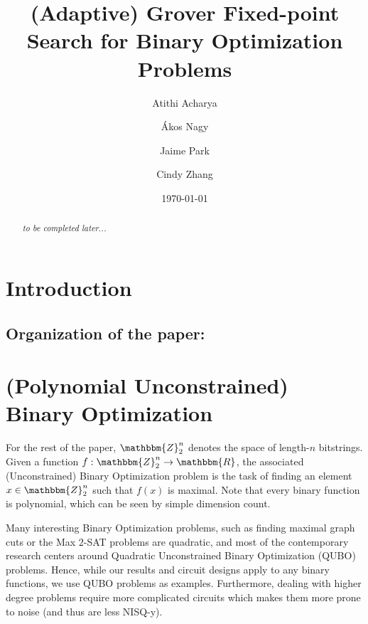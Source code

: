 \documentclass[reqno,oneside,12pt]{amsart}  %
\title{(Adaptive) Grover Fixed-point Search for Binary Optimization Problems}
\date{\today}
\author{Atithi Acharya}
\author{\'Akos Nagy}
\author{Jaime Park}
\author{Cindy Zhang}
\numberwithin{equation}{section}                %
\newtheorem*{acknowledgment}{Acknowledgments}
\def\rl{\mathbbm{R}}
\def\Z{\mathbbm{Z}}
\begin{document}
\begin{abstract}
	\textit{to be completed later...}
\end{abstract}

\maketitle

\section{Introduction}


\smallskip

\subsection*{Organization of the paper:} 

\begin{comment}
\smallskip

\begin{acknowledgment}
   
\end{acknowledgment}
\end{comment}

\bigskip

\section{(Polynomial Unconstrained) Binary Optimization}
\label{sec:qubos}

For the rest of the paper, $\Z_2^n$ denotes the space of length-$n$ bitstrings. Given a function $f : \Z_2^n \rightarrow \rl$, the associated (Unconstrained) Binary Optimization problem is the task of finding an element $x \in \Z_2^n$ such that $f (x)$ is maximal. Note that every binary function is polynomial, which can be seen by simple dimension count.

Many interesting Binary Optimization problems, such as finding maximal graph cuts or the Max $2$-SAT problems are quadratic, and most of the contemporary research centers around Quadratic Unconstrained  Binary Optimization (QUBO) problems. Hence, while our results and circuit designs apply to any binary functions, we use QUBO problems as examples. Furthermore, dealing with higher degree problems require more complicated circuits which makes them more prone to noise (and thus are less NISQ-y).
\end{document}

